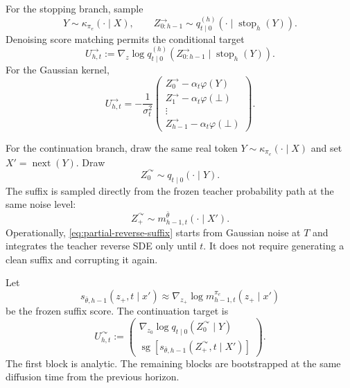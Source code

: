 \documentclass[11pt]{article}
\theoremstyle{definition}
\theoremstyle{remark}
\newcommand{\nextx}{\operatorname{next}}
\newcommand{\stoptraj}{\operatorname{stop}}
\newcommand{\sg}{\operatorname{sg}}
\newcommand{\emptytok}{\bot}
\newcommand{\score}{s}
\newcommand{\Teacher}{\bar\theta}
\newcommand{\targetpi}{\pi_e}
\newcommand{\branchstop}{\rightarrow}
\newcommand{\branchcont}{\curvearrowright}
\begin{document}
For the stopping branch, sample
\begin{equation}
Y\sim\kappa_{\targetpi}(\cdot\mid X),
\qquad
Z^{\branchstop}_{0:h-1}
\sim
q_{t\mid0}^{(h)}
(\cdot\mid\stoptraj_h(Y)).
\label{eq:stop-sampling}
\end{equation}
Denoising score matching permits the conditional target
\begin{equation}
\boxed{
U_{h,t}^{\branchstop}
:=
\nabla_z
\log
q_{t\mid0}^{(h)}
\left(
Z^{\branchstop}_{0:h-1}
\mid
\stoptraj_h(Y)
\right).
}
\label{eq:stop-score-target}
\end{equation}
For the Gaussian kernel,
\begin{equation}
U_{h,t}^{\branchstop}
=
-
\frac{1}{\sigma_t^2}
\begin{pmatrix}
Z_0^{\branchstop}-\alpha_t\varphi(Y)
\\
Z_1^{\branchstop}-\alpha_t\varphi(\emptytok)
\\
\vdots
\\
Z_{h-1}^{\branchstop}-\alpha_t\varphi(\emptytok)
\end{pmatrix}.
\label{eq:stop-gaussian-score}
\end{equation}

For the continuation branch, draw the same real token
$Y\sim\kappa_{\targetpi}(\cdot\mid X)$ and set
$X'=\nextx(Y)$. Draw
\begin{equation}
Z_0^{\branchcont}
\sim
q_{t\mid0}(\cdot\mid Y).
\label{eq:cont-current-noise}
\end{equation}
The suffix is sampled directly from the frozen teacher probability path at the
same noise level:
\begin{equation}
Z_+^{\branchcont}
\sim
m_{h-1,t}^{\Teacher}
(\cdot\mid X').
\label{eq:partial-reverse-suffix}
\end{equation}
Operationally, \cref{eq:partial-reverse-suffix} starts from Gaussian noise at
$T$ and integrates the teacher reverse SDE only until $t$. It does not require
generating a clean suffix and corrupting it again.

Let
\begin{equation}
\score_{\Teacher,h-1}
(z_+,t\mid x')
\approx
\nabla_{z_+}
\log
m_{h-1,t}^{\targetpi}(z_+\mid x')
\end{equation}
be the frozen suffix score. The continuation target is
\begin{equation}
\boxed{
U_{h,t}^{\branchcont}
:=
\begin{pmatrix}
\nabla_{z_0}
\log q_{t\mid0}
(Z_0^{\branchcont}\mid Y)
\\[1mm]
\sg\!
\left[
\score_{\Teacher,h-1}
(Z_+^{\branchcont},t\mid X')
\right]
\end{pmatrix}.
}
\label{eq:continuation-score-target}
\end{equation}
The first block is analytic. The remaining blocks are bootstrapped at the same
diffusion time from the previous horizon.
\end{document}
